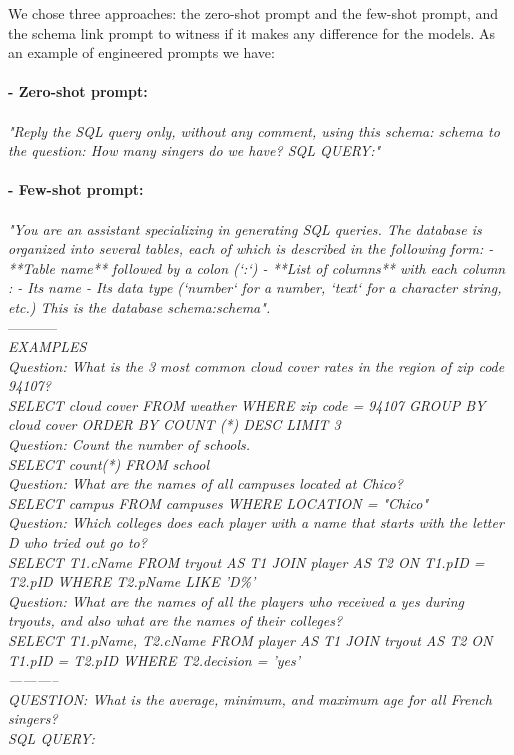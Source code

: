 \documentclass[12pt,a4paper]{article}
\begin{document}
We chose three approaches: the zero-shot prompt and the few-shot prompt, and the schema link prompt to witness if it makes any difference for the models. As an example of engineered prompts we have:\\
\\
\textbf{- Zero-shot prompt:} \\
\\
\textit{"Reply the SQL query only, without any comment, using this schema: {schema} to the question: How many singers do we have?
SQL QUERY:"}\\
\\
\textbf{- Few-shot prompt:} \\
\\
\textit{"You are an assistant specializing in generating SQL queries. The database is organized into several tables, each of which is described in the following form:
- **Table name** followed by a colon (`:`)
- **List of columns** with each column :
 - Its name
 - Its data type (`number` for a number, `text` for a character string, etc.)
 This is the database schema:{schema}".} \\
-----------\\
\textit{EXAMPLES\\
Question: What is the 3 most common cloud cover rates in the region of zip code 94107?\\
SELECT cloud cover FROM weather WHERE zip code = 94107 GROUP BY cloud cover ORDER BY COUNT (*) DESC LIMIT 3\\
Question: Count the number of schools.\\
SELECT count(*) FROM school\\
Question: What are the names of all campuses located at Chico?\\
SELECT campus FROM campuses WHERE LOCATION = "Chico"\\
Question: Which colleges does each player with a name that starts with the letter D who tried out go to?\\
SELECT T1.cName FROM tryout AS T1 JOIN player AS T2 ON T1.pID = T2.pID WHERE T2.pName LIKE 'D\%'\\
Question: What are the names of all the players who received a yes during tryouts, and also what are the names of their colleges?\\
SELECT T1.pName, T2.cName FROM player AS T1 JOIN tryout AS T2 ON T1.pID = T2.pID WHERE T2.decision = 'yes'\\
-----------\\
QUESTION: What is the average, minimum, and maximum age for all French singers?\\
SQL QUERY:}\\
\end{document}
